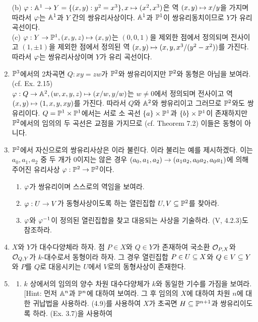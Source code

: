 \begin{enumerate}[label=\tb{4.\arabic*.},itemindent=0mm,itemsep=4mm]
		(b) $\varphi:\mathbb{A}^1\rightarrow Y=\{(x,y):y^2=x^3\},x\mapsto(x^2,x^3)$은 역 $(x,y)\mapsto x/y$을 가지며
		따라서 $\varphi$는 $\mathbb{A}^1$과 $Y$ 간의 쌍유리사상이다. $\mathbb{A}^1$과 $\mathbb{P}^1$이 쌍유리동치이므로 $Y$가 유리 곡선이다.\\
		(c) $\varphi:Y\rightarrow\mathbb{P}^1,(x,y,z)\mapsto(x,y)$는 $(0,0,1)$을 제외한 점에서 정의되며 전사이고
		$(1,\pm1)$을 제외한 점에서 정의된 역 $(x,y)\mapsto(x,y,x^3/(y^2-x^2))$를 가진다.
		따라서 $\varphi$는 쌍유리사상이며 $Y$가 유리 곡선이다.
		\item $\mathbb{P}^3$에서의 2차곡면 $Q:xy=zw$가 $\mathbb{P}^2$와 쌍유리이지만 $\mathbb{P}^2$와 동형은 아님을 보여라. (cf. Ex. 2.15)\\
		\sol $\varphi:Q\rightarrow\mathbb{A}^2,(w,x,y,z)\mapsto(x/w,y/w)$는 $w\ne 0$에서 정의되며 전사이고 역 $(x,y)\mapsto(1,x,y,xy)$를 가진다.
		따라서 $Q$와 $\mathbb{A}^2$와 쌍유리이고 그러므로 $\mathbb{P}^2$와도 쌍유리이다.
		$Q=\mathbb{P}^1\times\mathbb{P}^1$에서는 서로 소 곡선 $\{a\}\times\mathbb{P}^1$과 $\{b\}\times\mathbb{P}^1$이 존재하지만
		$\mathbb{P}^2$에서의 임의의 두 곡선은 교점을 가지므로 (cf. Theorem 7.2) 이들은 동형이 아니다.
	\item {} $\mathbb{P}^2$에서 자신으로의 쌍유리사상은
	이라 불린다.
	이라 불리는 예를 제시하겠다. 이는 $a_0,a_1,a_2$ 중 두 개가 0이지는 않은 경우
	$(a_0,a_1,a_2)\rightarrow(a_1a_2,a_0a_2,a_0a_1)$에 의해 주어진 유리사상 $\varphi:\mathbb{P}^2\rightarrow\mathbb{P}^2$이다.
	\begin{enumerate}[label=(\alph*)]
	\item $\varphi$가 쌍유리이며 스스로의 역임을 보여라.
	\item $\varphi:U\rightarrow V$가 동형사상이도록 하는 열린집합 $U,V\subseteq\mathbb{P}^2$를 찾아라.
	\item $\varphi$와 $\varphi^{-1}$이 정의된 열린집합을 찾고 대응되는 사상을 기술하라. (V, 4.2.3)도 참조하라.
	\end{enumerate}
	\item $X$와 $Y$가 대수다양체라 하자. 점 $P\in X$와 $Q\in Y$가 존재하여
	국소환 $\mathcal{O}_{P,X}$와 $\mathcal{O}_{Q,Y}$가 $k$-대수로서 동형이라 하자.
	그 경우 열린집합 $P\in U\subseteq X$와 $Q\in V\subseteq Y$와 $P$를 $Q$로 대응시키는 $U$에서 $V$로의 동형사상이 존재한다.
	\item \begin{enumerate}[label=(\alph*)]
	\item $k$ 상에서의 임의의 양수 차원 대수다양체가 $k$와 동일한 기수를 가짐을 보여라.
	[Hint: 먼저 $\mathbb{A}^n$과 $\mathbb{P}^n$에 대하여 보여라. 그 후 임의의 $X$에 대하여 차원 $n$에 대한 귀납법을 사용하라.
	(4.9)를 사용하여 $X$가 초곡면 $H\subseteq\mathbb{P}^{n+1}$과 쌍유리이도록 하라. (Ex. 3.7)을 사용하여

\end{enumerate}
\end{enumerate}
